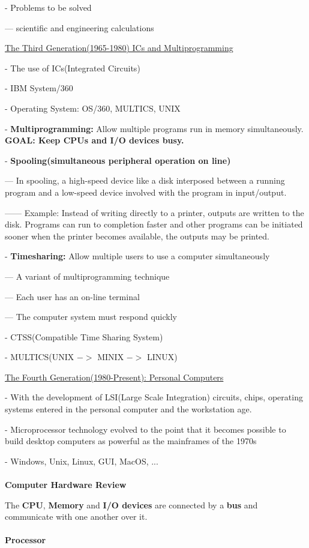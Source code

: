 \documentclass[]{report}
\begin{document}
- Problems to be solved

--- scientific and engineering calculations

\underline{The Third Generation(1965-1980) ICs and Multiprogramming}

- The use of ICs(Integrated Circuits)

- IBM System/360

- Operating System: OS/360, MULTICS, UNIX

- \textbf{Multiprogramming: }Allow multiple programs run in memory simultaneously. \textbf{GOAL: Keep CPUs and I/O devices busy.}

- \textbf{Spooling(simultaneous peripheral operation on line)}

--- In spooling, a high-speed device like a disk interposed between a running program and a low-speed device involved with the program in input/output.

------ Example: Instead of writing directly to a printer, outputs are written to the disk. Programs can run to completion faster and other programs can be initiated sooner when the printer becomes available, the outputs may be printed.

- \textbf{Timesharing: }Allow multiple users to use a computer simultaneously

--- A variant of multiprogramming technique

--- Each user has an on-line terminal

--- The computer system must respond quickly

- CTSS(Compatible Time Sharing System)

- MULTICS(UNIX $->$ MINIX $->$ LINUX)

\underline{The Fourth Generation(1980-Present): Personal Computers}

- With the development of LSI(Large Scale Integration) circuits, chips, operating systems entered in the personal computer and the workstation age.

- Microprocessor technology evolved to the point that it becomes possible to build desktop computers as powerful as the mainframes of the 1970s

- Windows, Unix, Linux, GUI, MacOS, ...\\\\
\textbf{Computer Hardware Review}

The \textbf{CPU}, \textbf{Memory} and \textbf{I/O devices} are connected by a \textbf{bus} and communicate with one another over it.\\\\
\textbf{Processor}
\end{document}
